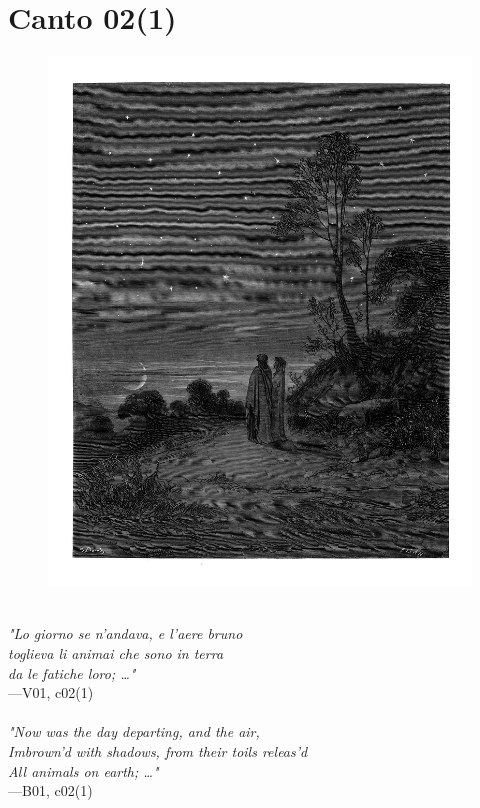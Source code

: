 \documentclass[../Dore_vision.tex]{subfiles}
\begin{document}
\newpage

\section{Canto 02(1)}

\begin{figure}[ht]
\centering
\includegraphics[height=\figsize]{illustrations/book_1/V01, c02(1).jpg}
\end{figure}

\begin{center}
\begin{minipage}{0.8\linewidth}
\textit{\\
"Lo giorno se n’andava, e l’aere bruno\\toglieva li animai che sono in terra\\da le fatiche loro; …"} \\
—V01, c02(1) \\~\\
\textit{"Now was the day departing, and the air,\\Imbrown'd with shadows, from their toils releas'd\\All animals on earth; …"} \\
—B01, c02(1)
\end{minipage}
\end{center}
\end{document}
